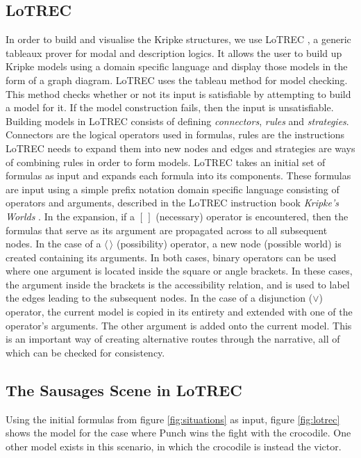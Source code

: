 \documentclass{llncs}
\begin{document}
\subsection{LoTREC}
In order to build and visualise the Kripke structures, we use LoTREC \cite{del2001lotrec}, a generic tableaux prover for modal and description logics. It allows the user to build up Kripke models using a domain specific language and display those models in the form of a graph diagram.
LoTREC uses the tableau method for model checking. This method checks whether or not its input is satisfiable by attempting to build a model for it. If the model construction fails, then the input is unsatisfiable.
Building models in LoTREC consists of defining \emph{connectors}, \emph{rules} and \emph{strategies}. Connectors are the logical operators used in formulas, rules are the instructions LoTREC needs to expand them into new nodes and edges and strategies are ways of combining rules in order to form models.
LoTREC takes an initial set of formulas as input and expands each formula into its components. These formulas are input using a simple prefix notation domain specific language consisting of operators and arguments, described in the LoTREC instruction book \emph{Kripke's Worlds} \cite{gasquet2013kripke}.
In the expansion, if a $[\,]$ (necessary) operator is encountered, then the formulas that serve as its argument are propagated across to all subsequent nodes. In the case of a $\langle \, \rangle$ (possibility) operator, a new node (possible world) is created containing its arguments. In both cases, binary operators can be used where one argument is located inside the square or angle brackets. In these cases, the argument inside the brackets is the accessibility relation, and is used to label the edges leading to the subsequent nodes.
In the case of a disjunction ($\lor$) operator, the current model is copied in its entirety and extended with one of the operator's arguments. The other argument is added onto the current model. This is an important way of creating alternative routes through the narrative, all of which can be checked for consistency.

\subsection{The Sausages Scene in LoTREC}

Using the initial formulas from figure \ref{fig:situations} as input, figure \ref{fig:lotrec} shows the model for the case where Punch wins the fight with the crocodile. One other model exists in this scenario, in which the crocodile is instead the victor.
\end{document}
